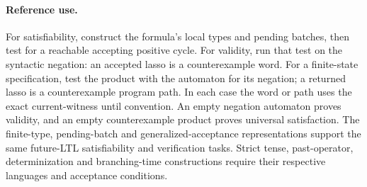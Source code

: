 \paragraph{Reference use.}
For satisfiability, construct the formula's local types and pending
batches, then test for a reachable accepting positive cycle.
For validity, run that test on the syntactic negation: an
accepted lasso is a counterexample word. For a finite-state
specification, test the product with the automaton for its
negation; a returned lasso is a counterexample program path.
In each case the word or path uses the exact current-witness
until convention. An empty negation automaton proves validity,
and an empty counterexample product proves universal satisfaction.
The finite-type,
pending-batch and generalized-acceptance representations support
the same future-LTL satisfiability and verification tasks.
Strict tense, past-operator, determinization and branching-time
constructions require their respective languages and acceptance
conditions.
